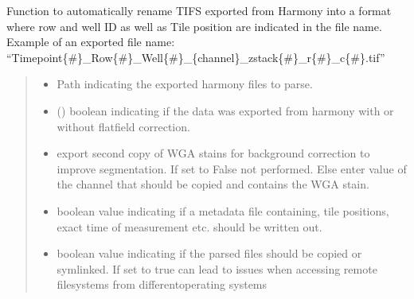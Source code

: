 \documentclass[a4paper,10pt,english,openany,oneside]{sphinxmanual}
\begin{document}
\begin{fulllineitems}
\label{\detokenize{pages/modules:vipertools.parse.parse_phenix}}
\pysigstartsignatures
{}
\pysigstopsignatures
\sphinxAtStartPar
Function to automatically rename TIFS exported from Harmony into a format where row and well ID as well as Tile position are indicated in the file name.
Example of an exported file name: “Timepoint\{\#\}\_Row\{\#\}\_Well\{\#\}\_\{channel\}\_zstack\{\#\}\_r\{\#\}\_c\{\#\}.tif”
\begin{quote}\begin{description}
\begin{itemize}
\item {} 
\sphinxAtStartPar
{} \textendash{} Path indicating the exported harmony files to parse.

\item {} 
\sphinxAtStartPar
{} () \textendash{} boolean indicating if the data was exported from harmony with or without flatfield correction.

\item {} 
\sphinxAtStartPar
{} \textendash{} export second copy of WGA stains for background correction to improve segmentation. If set to False not performed. Else enter value of the channel
that should be copied and contains the WGA stain.

\item {} 
\sphinxAtStartPar
{} \textendash{} boolean value indicating if a metadata file containing, tile positions, exact time of measurement etc. should be written out.

\item {} 
\sphinxAtStartPar
{} \textendash{} boolean value indicating if the parsed files should be copied or symlinked. If set to true can lead to issues when accessing remote filesystems
from differentoperating systems

\end{itemize}

\end{description}\end{quote}

\end{fulllineitems}
\end{document}
